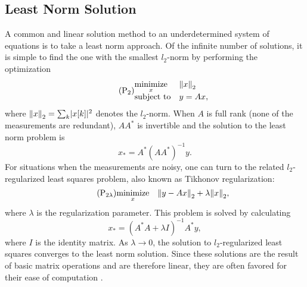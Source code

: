 \subsection{Least Norm Solution}
A common and linear solution method to an underdetermined system of equations is to take a least norm approach. Of the infinite number of solutions, it is simple to find the one with the smallest $l_2$-norm by performing the optimization
\begin{equation*}\tag{$\text{P}_\text{2}$}
 \begin{matrix*}[l]
  \underset{x}{\mathrm{minimize}} & \norm{2}{x}\\
  \text{subject to} & y = Ax,
 \end{matrix*}
\end{equation*}
where $\norm{2}{x} = \sum_k \abs{x[k]}^2$ denotes the $l_2$-norm. When $A$ is full rank (none of the measurements are redundant), $AA^*$ is invertible and the solution to the least norm problem is
\begin{equation}\label{eq:least_norm_solution}
 x_* = A^*(AA^*)^{-1}y.
\end{equation}
For situations when the measurements are noisy, one can turn to the related $l_2$-regularized least squares problem, also known as Tikhonov regularization:
\begin{equation*}\tag{$\text{P}_{\text{2}\lambda}$}
 \underset{x}{\mathrm{minimize}} \quad \norm{2}{y - Ax} + \lambda\norm{2}{x},
\end{equation*}
where $\lambda$ is the regularization parameter. This problem is solved by calculating 
\begin{equation}
 x_* = (A^*A + \lambda I)^{-1} A^* y,
\end{equation}
where $I$ is the identity matrix. As $\lambda \rightarrow 0$, the solution to $l_2$-regularized least squares converges to the least norm solution. Since these solutions are the result of basic matrix operations and are therefore linear, they are often favored for their ease of computation \autocite[Lecture 8]{Boy08}.

